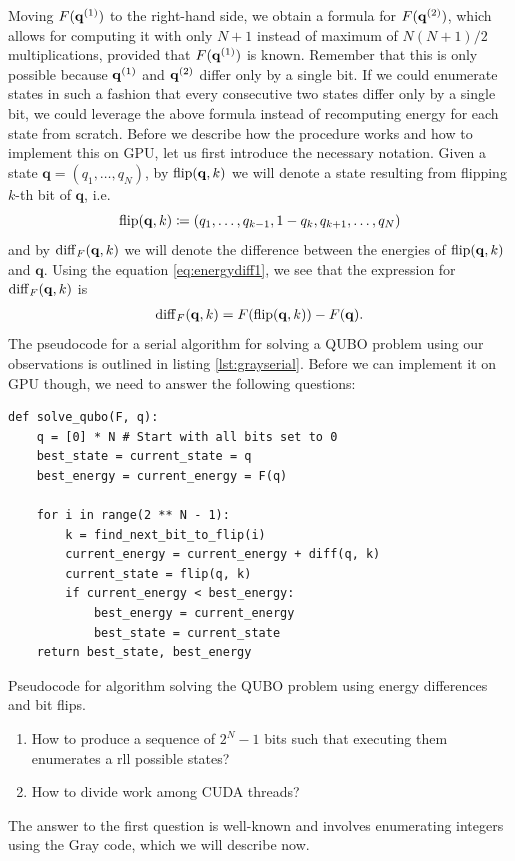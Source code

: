 Moving $F(\mathbf{q}^{(1)})$ to the right-hand side, we obtain a formula for $F(\mathbf{q}^{(2)})$,
    which allows for computing it with only $N+1$ instead of maximum of $N(N+1)/2$
    multiplications, provided that $F(\mathbf{q}^{(1)})$ is known. Remember that this is only
    possible because $\mathbf{q}^{(1)}$ and $\mathbf{q}^{(2)}$ differ only by a single bit. If we could
    enumerate states in such a fashion that every consecutive two states differ
    only by a single bit, we could leverage the above formula instead of
    recomputing energy for each state from scratch. Before we describe how the
    procedure works and how to implement this on GPU, let us first introduce the
    necessary notation. Given a state $\mathbf{q} = (q_{1},\ldots,q_{N})$, by
  $\operatorname*{flip}(\mathbf{q},k)$ we will denote a state resulting from flipping $k$-th
    bit of $\mathbf{q}$, i.e.
    \begin{equation}
      \operatorname*{flip}(\mathbf{q},k) \coloneq (q_{1}, \ldots, q_{k-1}, 1-q_{k}, q_{k+1}, \ldots, q_{N})
    \end{equation}
    and by $\operatorname{diff}_{F}(\mathbf{q},k)$ we will denote the difference between the
    energies of $\operatorname*{flip}(\mathbf{q},k)$ and $\mathbf{q}$. Using the equation
\eqref{eq:energydiff1}, we see that the expression for
$\operatorname{diff}_{F}(\mathbf{q},k)$ is
\begin{align}
  \begin{split}
    \operatorname{diff}_{F}(\mathbf{q},k) = F(\operatorname*{flip}(\mathbf{q},k)) - F(\mathbf{q}).
  \end{split}
\end{align}
The pseudocode for a serial algorithm for solving a QUBO problem using our
observations is outlined in listing \ref{lst:grayserial}. Before we can
implement it on GPU though, we need to answer the following questions:
\begin{listing}
  \begin{verbatim}
def solve_qubo(F, q):
    q = [0] * N # Start with all bits set to 0
    best_state = current_state = q
    best_energy = current_energy = F(q)

    for i in range(2 ** N - 1):
        k = find_next_bit_to_flip(i)
        current_energy = current_energy + diff(q, k)
        current_state = flip(q, k)
        if current_energy < best_energy:
            best_energy = current_energy
            best_state = current_state
    return best_state, best_energy
\end{verbatim}
  \caption{Pseudocode for algorithm solving the QUBO problem using energy differences and
    bit flips.} \label{lst:grayserial}
\end{listing}
\begin{enumerate}
  \item How to produce a sequence of $2^{N}-1$ bits such that executing them enumerates
    a rll possible states?
  \item How to divide work among CUDA threads?
\end{enumerate}
The answer to the first question is well-known and involves enumerating
integers using the Gray code, which we will describe now.

